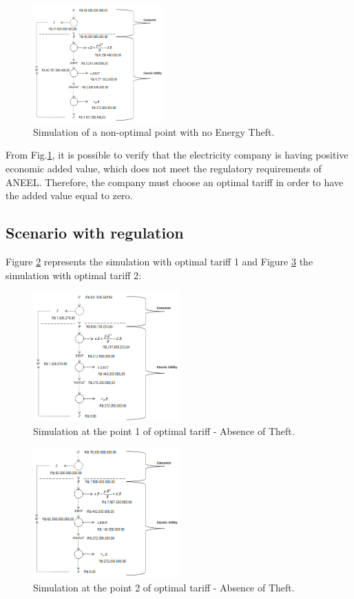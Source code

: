 \documentclass[preprint,12pt]{elsarticle}
\begin{document}
\begin{figure}[h]%
\centering
\includegraphics[width = 0.45\textwidth]{Fig6.png} 
\caption{Simulation of a non-optimal point with no Energy Theft.}
\label{Fig6}
\end{figure}

From Fig.\ref{Fig6}, it is possible to verify that the electricity company is having positive economic added value, which does not meet the regulatory requirements of ANEEL. Therefore, the company must choose an optimal tariff in order to have the added value equal to zero.\\

\subsection{Scenario with regulation}
\label{sec3-2}
Figure \ref{Fig7} represents the simulation with optimal tariff 1 and Figure \ref{Fig8} the simulation with optimal tariff 2:
\begin{figure}[h]%
\centering
\includegraphics[width = 0.5\textwidth]{Fig7.png} 
\caption{Simulation at the point 1 of optimal tariff - Absence of Theft.}
\label{Fig7}
\end{figure}


\begin{figure}[h]%
\centering
\includegraphics[width = 0.5\textwidth]{Fig8.png} 
\caption{Simulation at the point 2 of optimal tariff - Absence of Theft.}
\label{Fig8}
\end{figure}
\end{document}
